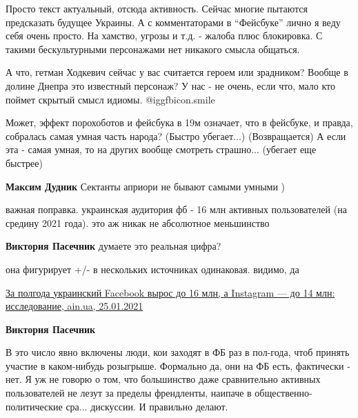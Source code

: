  
 
 
 
 
\zzSecCmt

\begin{itemize} %

Просто текст актуальный, отсюда активность. Сейчас многие пытаются предсказать
будущее Украины. А с комментаторами в \enquote{Фейсбуке} лично я веду себя очень
просто. На хамство, угрозы и т.д. - жалоба плюс блокировка. С такими
бескультурными персонажами нет никакого смысла общаться.


А что, гетман Ходкевич сейчас у вас считается героем или зрадником? Вообще в
долине Днепра это известный персонаж? У нас - не очень, если что, мало кто
поймет скрытый смысл идиомы.  @igg{fbicon.smile} 


Может, эффект порохоботов и фейсбука в 19м означает, что в фейсбуке, и правда,
собралась самая умная часть народа? (Быстро убегает...) (Возвращается) А если
эта - самая умная, то на других вообще смотреть страшно... (убегает еще
быстрее)

\textbf{Максим Дудник} Сектанты априори не бывают самыми умными )


важная поправка. украинская аудитория фб - 16 млн активных пользователей (на
средину 2021 года). это аж никак не абсолютное меньшинство

\begin{itemize} %
\textbf{Виктория Пасечник} думаете это реальная цифра?

она фигурирует +/- в нескольких источниках одинаковая. видимо, да 

\href{https://ain.ua/ru/2021/01/25/ukrainskij-facebook-instagram-2021}{%
За полгода украинский Facebook вырос до 16 млн, а Instagram — до 14 млн: исследование, %
ain.ua, 25.01.2021%
}

\textbf{Виктория Пасечник} 

В это число явно включены люди, кои заходят в ФБ раз в пол-года, чтоб принять
участие в каком-нибудь розыгрыше. Формально да, они на ФБ есть, фактически -
нет. Я уж не говорю о том, что большинство даже сравнительно активных
пользователей не лезут за пределы френдленты, наипаче в
общественно-политические сра... дискуссии. И правильно делают.


\end{itemize}
\end{itemize}
